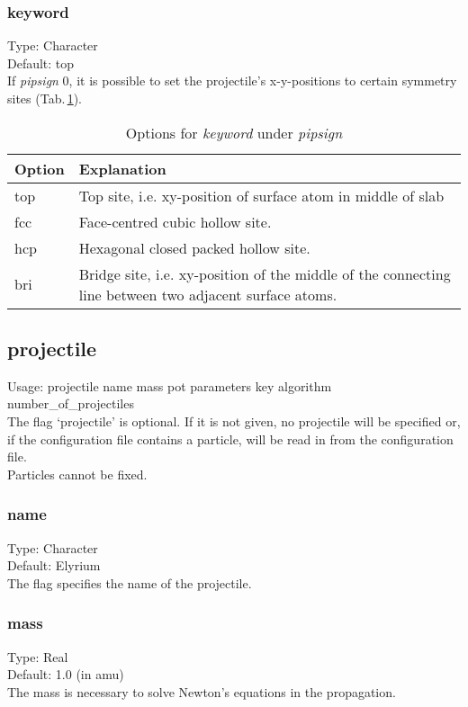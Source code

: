 \documentclass[twoside, 11pt, titlepage, captions=nooneline, a4paper, headsepline]{scrbook}%
\begin{document}
\subsubsection*{keyword}
Type: Character\\
Default: top\\
If \emph{pipsign} 0, it is possible to set the projectile's x-y-positions to certain symmetry sites (Tab.\,\ref{pips-keyword}).
\begin{table}[H!]
\centering
\caption{Options for \emph{keyword} under \emph{pipsign}}
\label{pips-keyword}
\begin{tabular}{p{2cm}p{11cm}}
\hline\hline
Option&Explanation\\
\hline
top& Top site, i.e. xy-position of surface atom in middle of slab\\
fcc& Face-centred cubic hollow site.\\
hcp& Hexagonal closed packed hollow site.\\
bri& Bridge site, i.e. xy-position of the middle of the connecting line between two adjacent surface atoms.\\
\hline
\end{tabular}
\end{table}

\subsection*{projectile}
Usage: projectile name mass pot parameters key algorithm number\_of\_projectiles\\
The flag `projectile' is optional. If it is not given, no projectile will be specified or, if the configuration file contains a particle, will be read in from the configuration file.\\
Particles cannot be fixed.\\
\subsubsection*{name}
Type: Character\\
Default: Elyrium\\
The flag specifies the name of the projectile.
\subsubsection*{mass}
Type: Real\\
Default: 1.0 (in amu)\\
The mass is necessary to solve Newton's equations in the propagation.
\end{document}
